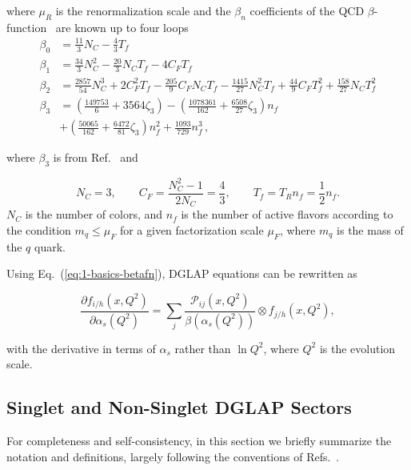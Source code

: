 \documentclass[12pt,notitlepage,aps,preprintnumbers,superscriptaddress,nofootinbib,aps,prd,floatfix]{revtex4-2}
\newcommand{\ddp}{\partial}
\begin{document}
where $\mu_R$ is the renormalization scale and the $\beta_n$ coefficients of the QCD $\beta$-function~\cite{Gross:1973id,Politzer:1974fr}  are known up to four loops~\cite{vanRitbergen:1997va,Czakon:2004bu}
%
\begin{align}
\beta_{0}  &=  \frac{11}{3}N_{C}-\frac{4}{3}T_{f} \\
\beta_{1}  &=  \frac{34}{3}N_{C}^{2}-\frac{20}{3}N_{C}T_{f}-4C_{F}T_{f}   
\\
\beta_{2}  &= 
\frac{2857}{54}N_{C}^{3}+2C_{F}^{2}T_{f}-\frac{205}{9}C_{F}N_{C}T_{f}-\frac{1415}{27}N_{C}^{2}T_{f}
+\frac{44}{9}C_{F}T_{f}^{2}+\frac{158}{27}N_{C}T_{f}^{2} 
\\
\beta_3 & =   \left( \frac{149753}{6} + 3564 \zeta_3 \right)
        - \left( \frac{1078361}{162} + \frac{6508}{27} \zeta_3 \right) n_f
  \nonumber \\ 
       &+ \left( \frac{50065}{162} + \frac{6472}{81} \zeta_3 \right) n_f^2
       +  \frac{1093}{729}  n_f^3\,,
\label{eq:beta3}
\end{align}

where $\beta_3$ is from Ref.~\cite{vanRitbergen:1997va} and

\begin{equation}
N_{C}=3,\qquad C_{F}=\frac{N_{C}^{2}-1}{2N_{C}}=\frac{4}{3},\qquad
T_{f}=T_{R}n_{f}=\frac{1}{2}n_{f}.
\end{equation}
$N_{C}$ is the number of colors, and $n_{f}$ is the number of
active flavors according to the condition $m_{q}\leq \mu_F$ for a given factorization scale
$\mu_F$, where $m_q$ is the mass of the $q$ quark.

Using Eq.~(\ref{eq:1-basics-betafn}), DGLAP equations can be rewritten as 

\begin{equation}
  \label{eq:dglap-main}
  \frac{\ddp f_{i/h}(x,Q^2)}{\ddp \alpha_s(Q^2)} = \sum_j \frac{\mathcal{P}_{ij}(x,Q^2)}{\beta(\alpha_s(Q^2))} \otimes f_{j/h}(x,Q^2),
\end{equation}

with the derivative in terms of $\alpha_s$ rather than $\ln Q^2$, where $Q^2$ is the evolution scale. 



\subsection{Singlet and Non-Singlet DGLAP Sectors}
\label{S-NS-sectors}

For completeness and self-consistency, in this section we briefly summarize the notation and definitions, largely following the conventions of Refs.~\cite{Vogt:2004mw,Vogt:2004ns,Cafarella:2005zj,Cafarella:2008du}.
\end{document}
